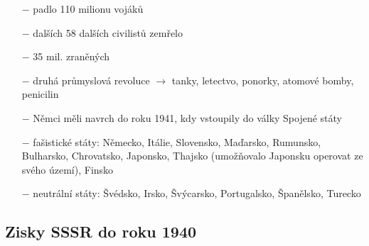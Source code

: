\documentclass{article}
\begin{document}
\begin{itemize}
    \vspace{-0.5em}
    \setlength\itemsep{0.15em}
    \item[$-$] padlo 110 milionu vojáků
    \item[$-$] dalších 58 dalších civilistů zemřelo
    \item[$-$] 35 mil. zraněných
    \item[$-$] druhá průmyslová revoluce $\rightarrow$ tanky, letectvo, ponorky, atomové bomby, penicilin
    \item[$-$] Němci měli navrch do roku 1941, kdy vstoupily do války Spojené státy
    \item[$-$] fašistické státy: Německo, Itálie, Slovensko, Maďarsko, Rumunsko, Bulharsko, Chrovatsko, Japonsko, Thajsko (umožňovalo Japonsku operovat ze svého území), Finsko
    \item[$-$] neutrální státy: Švédsko, Irsko, Švýcarsko, Portugalsko, Španělsko, Turecko
\end{itemize}

\subsection*{Zisky SSSR do roku 1940}
\begin{itemize}
    \vspace{-0.5em}
    \setlength\itemsep{0.15em}
    \item[] 
\end{itemize}
\end{document}
